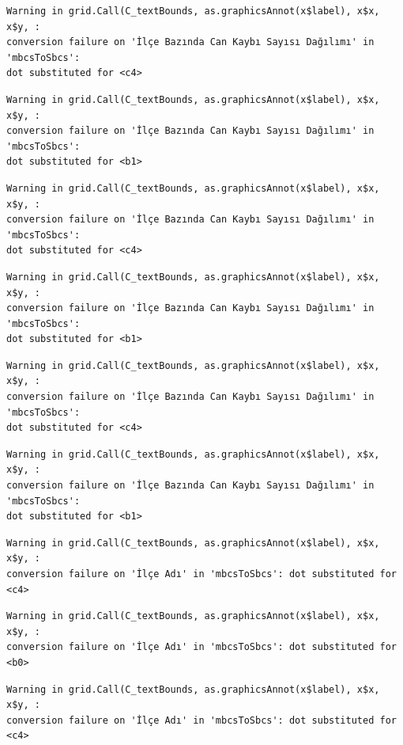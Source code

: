 \documentclass[
  11pt,
  a4paper,
  DIV=11,
  numbers=noendperiod]{scrartcl}
\begin{document}
\begin{verbatim}
Warning in grid.Call(C_textBounds, as.graphicsAnnot(x$label), x$x, x$y, :
conversion failure on 'İlçe Bazında Can Kaybı Sayısı Dağılımı' in 'mbcsToSbcs':
dot substituted for <c4>
\end{verbatim}

\begin{verbatim}
Warning in grid.Call(C_textBounds, as.graphicsAnnot(x$label), x$x, x$y, :
conversion failure on 'İlçe Bazında Can Kaybı Sayısı Dağılımı' in 'mbcsToSbcs':
dot substituted for <b1>
\end{verbatim}

\begin{verbatim}
Warning in grid.Call(C_textBounds, as.graphicsAnnot(x$label), x$x, x$y, :
conversion failure on 'İlçe Bazında Can Kaybı Sayısı Dağılımı' in 'mbcsToSbcs':
dot substituted for <c4>
\end{verbatim}

\begin{verbatim}
Warning in grid.Call(C_textBounds, as.graphicsAnnot(x$label), x$x, x$y, :
conversion failure on 'İlçe Bazında Can Kaybı Sayısı Dağılımı' in 'mbcsToSbcs':
dot substituted for <b1>
\end{verbatim}

\begin{verbatim}
Warning in grid.Call(C_textBounds, as.graphicsAnnot(x$label), x$x, x$y, :
conversion failure on 'İlçe Bazında Can Kaybı Sayısı Dağılımı' in 'mbcsToSbcs':
dot substituted for <c4>
\end{verbatim}

\begin{verbatim}
Warning in grid.Call(C_textBounds, as.graphicsAnnot(x$label), x$x, x$y, :
conversion failure on 'İlçe Bazında Can Kaybı Sayısı Dağılımı' in 'mbcsToSbcs':
dot substituted for <b1>
\end{verbatim}

\begin{verbatim}
Warning in grid.Call(C_textBounds, as.graphicsAnnot(x$label), x$x, x$y, :
conversion failure on 'İlçe Adı' in 'mbcsToSbcs': dot substituted for <c4>
\end{verbatim}

\begin{verbatim}
Warning in grid.Call(C_textBounds, as.graphicsAnnot(x$label), x$x, x$y, :
conversion failure on 'İlçe Adı' in 'mbcsToSbcs': dot substituted for <b0>
\end{verbatim}

\begin{verbatim}
Warning in grid.Call(C_textBounds, as.graphicsAnnot(x$label), x$x, x$y, :
conversion failure on 'İlçe Adı' in 'mbcsToSbcs': dot substituted for <c4>
\end{verbatim}
\end{document}
